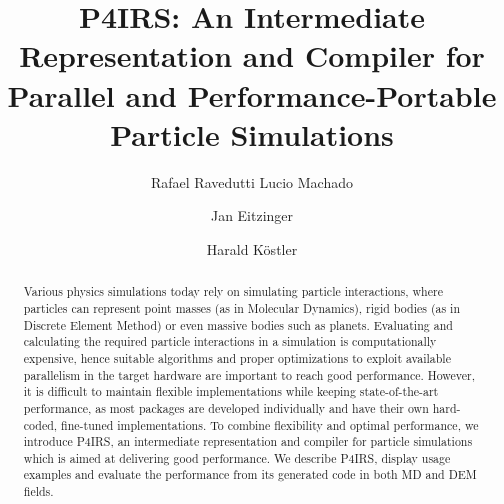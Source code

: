 \documentclass[preprint,12pt]{elsarticle}
\begin{document}
\begin{frontmatter}



\title{P4IRS: An Intermediate Representation and Compiler for Parallel and Performance-Portable Particle Simulations}


\author[nhratfau]{Rafael Ravedutti Lucio Machado}
\author[nhratfau]{Jan Eitzinger}
\author[nhratfau]{Harald Köstler}

\affiliation[nhratfau]{
	organization={Erlangen National High Performance Computing Center}, %
	addressline={Martensstraße 1},
	city={Erlangen},
	postcode={91058},
	state={Bayern},
	country={Germany}}

\begin{abstract}
Various physics simulations today rely on simulating particle interactions, where particles can represent point masses (as in Molecular Dynamics), rigid bodies (as in Discrete Element Method) or even massive bodies such as planets.
Evaluating and calculating the required particle interactions in a simulation is computationally expensive, hence suitable algorithms and proper optimizations to exploit available parallelism in the target hardware are important to reach good performance.
However, it is difficult to maintain flexible implementations while keeping state-of-the-art performance, as most packages are developed individually and have their own hard-coded, fine-tuned implementations.
To combine flexibility and optimal performance, we introduce P4IRS, an intermediate representation and compiler for particle simulations which is aimed at delivering good performance.
We describe P4IRS, display usage examples and evaluate the performance from its generated code in both MD and DEM fields.
\end{abstract}


\end{frontmatter}
\end{document}

